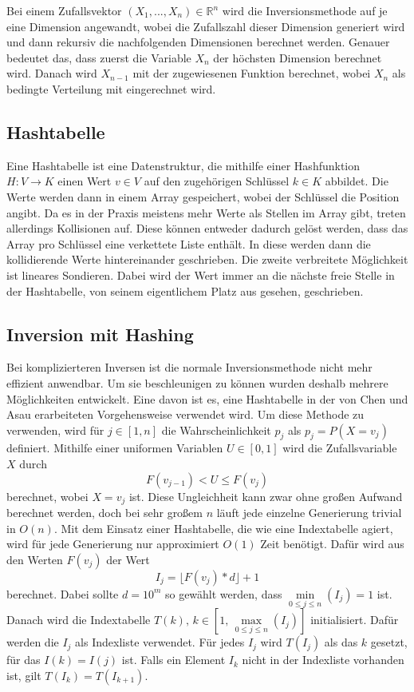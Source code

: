 Bei einem Zufallsvektor $ (X_1, ..., X_n) \in \mathbb{R}^n$ wird die 
Inversionsmethode auf je eine Dimension angewandt, wobei die Zufallszahl dieser 
Dimension generiert wird und dann rekursiv die nachfolgenden Dimensionen 
berechnet werden. Genauer bedeutet das, dass zuerst die Variable $X_n$ der 
höchsten Dimension berechnet wird. Danach wird $X_{n-1}$ mit der zugewiesenen 
Funktion berechnet, wobei $X_n$ als bedingte Verteilung mit eingerechnet wird.


\subsection{Hashtabelle}
Eine Hashtabelle ist eine Datenstruktur, die mithilfe einer Hashfunktion 
$H: V \rightarrow K$ einen Wert $v \in V$ auf den zugehörigen Schlüssel $k \in K$ 
abbildet. Die Werte werden dann in einem Array gespeichert, wobei der Schlüssel 
die Position angibt. Da es in der Praxis meistens mehr Werte als Stellen im Array 
gibt, treten allerdings Kollisionen auf. Diese können entweder dadurch gelöst 
werden, dass das Array pro Schlüssel eine verkettete Liste enthält. In diese 
werden dann die kollidierende Werte hintereinander geschrieben. Die zweite 
verbreitete Möglichkeit ist lineares Sondieren. Dabei wird der Wert immer an die 
nächste freie Stelle in der Hashtabelle, von seinem eigentlichem Platz aus 
gesehen, geschrieben.


\subsection{Inversion mit Hashing}
Bei komplizierteren Inversen ist die normale Inversionsmethode nicht 
mehr effizient anwendbar. Um sie beschleunigen zu können wurden deshalb mehrere 
Möglichkeiten entwickelt. Eine davon ist es, eine Hashtabelle in der von Chen und 
Asau \cite{chen_asau-generating_random_variates-1974} erarbeiteten Vorgehensweise 
verwendet wird. Um diese Methode zu verwenden, wird für $j \in [1, n]$ die 
Wahrscheinlichkeit $p_j$ als $p_j = P(X=v_j)$ definiert. Mithilfe einer uniformen 
Variablen $U \in [0, 1]$ wird die Zufallsvariable $X$ durch 
\begin{equation}
    F(v_{j-1}) < U \leq F(v_j)
    \label{eq:hash_ineq}
\end{equation}
berechnet, wobei $X = v_j$ ist. Diese Ungleichheit kann zwar ohne großen Aufwand 
berechnet werden, doch bei sehr großem $n$ läuft jede einzelne Generierung trivial 
in $O(n)$. Mit dem Einsatz einer Hashtabelle, die wie eine Indextabelle agiert, 
wird für jede Generierung nur approximiert $O(1)$ Zeit benötigt. Dafür wird aus 
den Werten $F(v_j)$ der Wert
\begin{equation}
     I_j = \lfloor F(v_j) * d \rfloor + 1
     \label{eq:hash_I}
\end{equation}
berechnet. Dabei sollte $d = 10^m$ so gewählt werden, dass $\min\limits_{0\le 
j\le n}(I_j) = 1$ ist. Danach wird die Indextabelle $T(k),\, k \in [1,\, \max
\limits_{0\le j\le n}(I_j)]$ initialisiert. Dafür werden die $I_j$ als Indexliste 
verwendet. Für jedes $I_j$ wird $T(I_j)$ als das $k$ gesetzt, für das $I(k) = 
I(j)$ ist. Falls ein Element $I_k$ nicht in der Indexliste vorhanden ist, gilt 
$T(I_k) = T(I_{k+1})$. 

